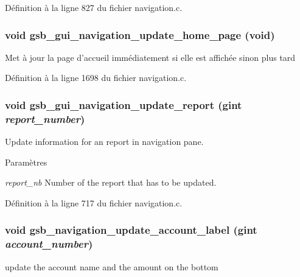 Définition à la ligne 827 du fichier navigation.c.

\subsubsection[{gsb\_\-gui\_\-navigation\_\-update\_\-home\_\-page}]{\setlength{\rightskip}{0pt plus 5cm}void gsb\_\-gui\_\-navigation\_\-update\_\-home\_\-page (void)}\label{navigation_8h_a4deacb31bc63a27b2ed5b39f79bffc0b}
Met à jour la page d'accueil immédiatement si elle est affichée sinon plus tard 

Définition à la ligne 1698 du fichier navigation.c.

\subsubsection[{gsb\_\-gui\_\-navigation\_\-update\_\-report}]{\setlength{\rightskip}{0pt plus 5cm}void gsb\_\-gui\_\-navigation\_\-update\_\-report (gint {\em report\_\-number})}\label{navigation_8h_adbca6d230d0584e10054913fbce3caf1}
Update information for an report in navigation pane.


\begin{DoxyParams}{Paramètres}
\item[{\em report\_\-nb}]Number of the report that has to be updated. \end{DoxyParams}


Définition à la ligne 717 du fichier navigation.c.

\subsubsection[{gsb\_\-navigation\_\-update\_\-account\_\-label}]{\setlength{\rightskip}{0pt plus 5cm}void gsb\_\-navigation\_\-update\_\-account\_\-label (gint {\em account\_\-number})}\label{navigation_8h_a85b5920bb0556b488e09294e8cfbcb0e}
update the account name and the amount on the bottom


